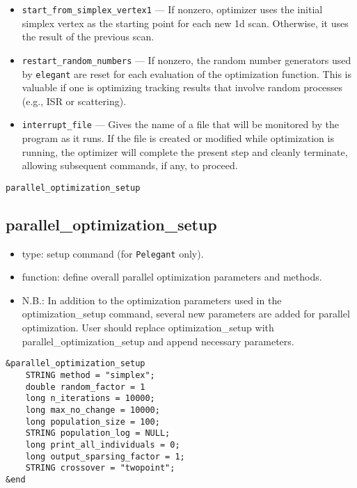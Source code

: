 \documentclass[11pt]{article}
\begin{document}
\begin{itemize}
\item \verb|start_from_simplex_vertex1| --- If nonzero, optimizer uses the initial simplex vertex as the
 starting point for each new 1d scan.  Otherwise, it uses the result of the previous scan.

\item \verb|restart_random_numbers| --- If nonzero, the random number generators used by {\tt elegant} are
 reset for each evaluation of the optimization function.  This is valuable if one is optimizing tracking
 results that involve random processes (e.g., ISR or scattering).

\item \verb|interrupt_file| --- Gives the name of a file that will be monitored by the program as it runs.
  If the file is created or modified while optimization is running, the optimizer will complete the present
  step and cleanly terminate, allowing subsequent commands, if any, to proceed.
\end{itemize}

\newpage
\begin{center}{\Large\verb|parallel_optimization_setup|}\end{center}
\subsection{parallel\_optimization\_setup \label{subsec:paralleloptimizationsetup}}

\begin{itemize}
\item type: setup command (for {\tt Pelegant} only).
\item function: define overall parallel optimization parameters and methods.
\item N.B.: In addition to the optimization parameters used in the optimization\_setup command, 	    
      several new parameters are added for parallel optimization. User should replace 
      optimization\_setup with parallel\_optimization\_setup and append necessary parameters. 
\end{itemize}

\begin{verbatim}
&parallel_optimization_setup
    STRING method = "simplex";
    double random_factor = 1
    long n_iterations = 10000;
    long max_no_change = 10000;
    long population_size = 100;
    STRING population_log = NULL;
    long print_all_individuals = 0;
    long output_sparsing_factor = 1;
    STRING crossover = "twopoint";
&end
\end{verbatim}
\end{document}
